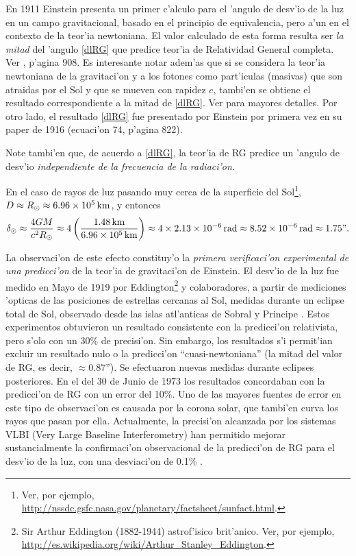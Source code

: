 En 1911 Einstein presenta un primer c'alculo para el 'angulo de desv'io de la luz en un campo gravitacional, basado en el principio de equivalencia, pero a'un en el contexto de la teor'ia newtoniana. El valor calculado de esta forma resulta ser \textit{la mitad} del 'angulo \eqref{dlRG} que predice teor'ia de Relatividad General completa. Ver \cite{Einstein11}, p'agina 908. Es interesante notar adem'as que si se considera la teor'ia newtoniana de la gravitaci'on y a los fotones como part'iculas (masivas) que son atraidas por el Sol y que se mueven con rapidez $c$, tambi'en se obtiene el resultado correspondiente a la mitad de \eqref{dlRG}. Ver \cite{Will88} para mayores detalles.  Por otro lado, el resultado \eqref{dlRG} fue presentado por Einstein por primera vez en su paper de 1916 \cite{Einstein16} (ecuaci'on 74, p'agina 822).

Note tambi'en que, de acuerdo a \eqref{dlRG}, la teor'ia de RG predice un 'angulo de desv'io \textit{independiente de la frecuencia de la radiaci'on}.

En el caso de rayos de luz pasando muy cerca de la superficie del Sol\footnote{Ver, por ejemplo, \url{http://nssdc.gsfc.nasa.gov/planetary/factsheet/sunfact.html}.}, $D\approx R_\odot\approx 6.96\times 10^5\text{\,km}$, y entonces
\begin{equation}
\delta_\odot\approx\frac{4GM}{c^2R_\odot}\approx 4\left(\frac{1.48\text{\,km}}{6.96\times 10^5\text{\,km}}\right)\approx 4\times 2.13\times 10^{-6}{\rm\, rad}\approx 8.52\times 10^{-6}{\rm\, rad}\approx 1.75\text{''}.
\end{equation}

La observaci'on de este efecto constituy'o la \textit{primera verificaci'on experimental de una predicci'on} de la teor'ia de gravitaci'on de Einstein. El desv'io de la luz fue medido en Mayo de 1919 por Eddington\footnote{Sir Arthur Eddington (1882-1944) astrof'isico brit'anico. Ver, por ejemplo, \url{http://es.wikipedia.org/wiki/Arthur_Stanley_Eddington}.} y colaboradores, a partir de mediciones 'opticas de las posiciones de estrellas cercanas al Sol, medidas durante un eclipse total de Sol, observado desde las islas atl'anticas de Sobral y Principe \cite{DED19}. Estos experimentos obtuvieron un resultado consistente con la predicci'on relativista, pero s'olo con un 30\% de precisi'on. Sin embargo, los resultados s'i permit'ian excluir un resultado nulo o la predicci'on ``cuasi-newtoniana'' (la mitad del valor de RG, es decir, $\approx 0.87$''). Se efectuaron nuevas medidas durante eclipses posteriores. En el del 30 de Junio de 1973 los resultados concordaban con la predicci'on de RG con un error del 10\%. Uno de las mayores fuentes de error en este tipo de observaci'on es causada por la corona solar, que tambi'en curva los rayos que pasan por ella. Actualmente, la precisi'on alcanzada por los sistemas VLBI (Very Large Baseline Interferometry) han permitido mejorar sustancialmente la confirmaci'on observacional de la predicci'on de RG para el desv'io de la luz, con una desviaci'on de 0.1\% \cite{SDLG04,Will06}.

